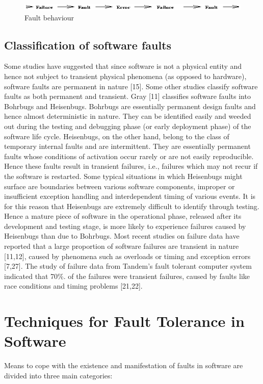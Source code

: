 \documentclass[oneside, a4paper, 11pt]{memoir}
\begin{document}
\begin{figure}[htbp]
	\centering
	\includegraphics[width=0.6\linewidth]{images/img1.png}
	\caption{Fault behaviour}
\end{figure}

\subsection{Classification of software faults}
Some studies have suggested that since software is not a physical entity and hence not subject to transient physical phenomena (as opposed to hardware), software faults are permanent in nature [15]. Some other studies classify software faults as both permanent and transient. Gray [11] classifies software faults into Bohrbugs and Heisenbugs. Bohrbugs are essentially permanent design faults and hence almost deterministic in nature. They can be identified easily and weeded out during the testing and debugging phase (or early deployment phase) of the software life cycle. Heisenbugs, on the other hand, belong to the class of temporary internal faults and are intermittent. They are essentially permanent faults whose conditions of activation occur rarely or are not easily reproducible. Hence these faults result in transient failures, i.e., failures which may not recur if the software is restarted. Some typical situations in which Heisenbugs might surface are boundaries between various software components, improper or insufficient exception handling and interdependent timing of various events. It is for this reason that Heisenbugs are extremely difficult to identify through testing. Hence a mature piece of software in the operational phase, released after its development and testing stage, is more likely to experience failures caused by Heisenbugs than due to Bohrbugs. Most recent studies on failure data have reported that a large proportion of software failures are transient in nature [11,12], caused by phenomena such as overloads or timing and exception errors [7,27]. The study of failure data from Tandem's fault tolerant computer system indicated that 70\%. of the failures were transient failures, caused by faults like race conditions and timing problems [21,22].

\section{Techniques for Fault Tolerance in Software}
Means to cope with the existence and manifestation of faults in software are divided into three main categories:
\end{document}
